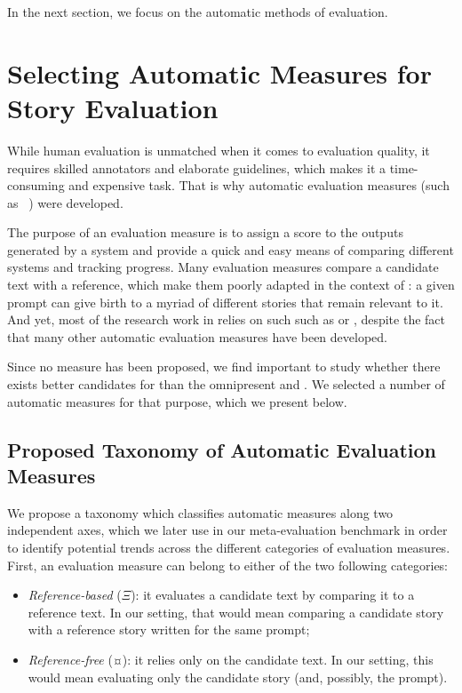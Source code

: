 In the next section, we focus on the automatic methods of {\asg} evaluation.

\section{Selecting Automatic Measures for Story Evaluation}
\label{sec:automatic_measures_story_evaluation}

While human evaluation is unmatched when it comes to evaluation quality, it requires skilled annotators and elaborate guidelines, which makes it a time-consuming and expensive task. That is why automatic evaluation measures (such as \bleu\ \citep{papineni2002bleu}) were developed.

The purpose of an evaluation measure is to assign a score to the outputs generated by a system and provide a quick and easy means of comparing different systems and tracking progress. Many evaluation measures compare a candidate text with a reference, which make them poorly adapted in the context of {\asgfull}: a given prompt can give birth to a myriad of different stories that remain relevant to it. And yet, most of the research work in {\asg} relies on such such as {\bleu} or {\rouge} \citep{lin2004rouge}, despite the fact that many other automatic evaluation measures have been developed.

Since no {\asefull} measure has been proposed, we find important to study whether there exists better candidates for {\ase} than the omnipresent {\bleu} and {\rouge}. We selected a number of automatic measures for that purpose, which we present below.

\subsection{Proposed Taxonomy of Automatic Evaluation Measures}
\label{sub:taxonomy_measures}

 We propose a taxonomy which classifies automatic measures along two independent axes, which we later use in our meta-evaluation benchmark in order to identify potential trends across the different categories of evaluation measures. First, an evaluation measure can belong to either of the two following categories:

\begin{itemize}[noitemsep]
    \item \emph{Reference-based} ($\Xi$): it evaluates a candidate text by comparing it to a reference text. In our {\asg} setting, that would mean comparing a candidate story with a reference story written for the same prompt;
    \item \emph{Reference-free} (¤): it relies only on the candidate text. In our {\asg} setting, this would mean evaluating only the candidate story (and, possibly, the prompt).
\end{itemize}

